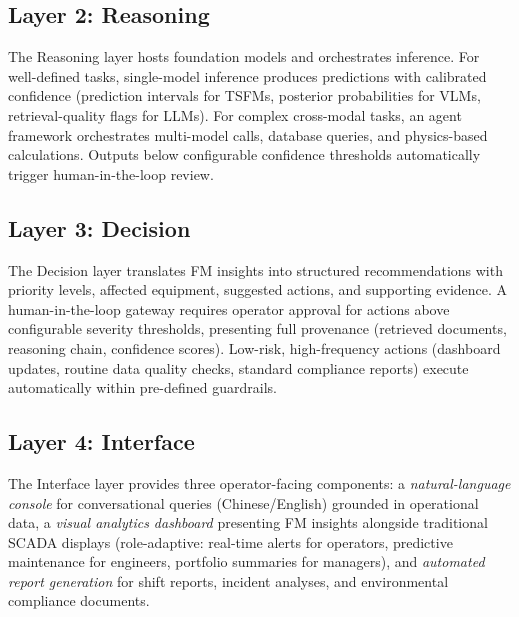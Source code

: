 \documentclass[preprint,12pt]{elsarticle}
\begin{document}
\subsection{Layer 2: Reasoning}
\label{subsec:reasoning}

The Reasoning layer hosts foundation models and orchestrates inference. For well-defined tasks, single-model inference produces predictions with calibrated confidence (prediction intervals for TSFMs, posterior probabilities for VLMs, retrieval-quality flags for LLMs). For complex cross-modal tasks, an agent framework \cite{yao2023react} orchestrates multi-model calls, database queries, and physics-based calculations. Outputs below configurable confidence thresholds automatically trigger human-in-the-loop review.

\subsection{Layer 3: Decision}
\label{subsec:decision}

The Decision layer translates FM insights into structured recommendations with priority levels, affected equipment, suggested actions, and supporting evidence. A human-in-the-loop gateway requires operator approval for actions above configurable severity thresholds, presenting full provenance (retrieved documents, reasoning chain, confidence scores). Low-risk, high-frequency actions (dashboard updates, routine data quality checks, standard compliance reports) execute automatically within pre-defined guardrails.

\subsection{Layer 4: Interface}
\label{subsec:interface}

The Interface layer provides three operator-facing components: a \textit{natural-language console} for conversational queries (Chinese/English) grounded in operational data, a \textit{visual analytics dashboard} presenting FM insights alongside traditional SCADA displays (role-adaptive: real-time alerts for operators, predictive maintenance for engineers, portfolio summaries for managers), and \textit{automated report generation} for shift reports, incident analyses, and environmental compliance documents.
\end{document}
